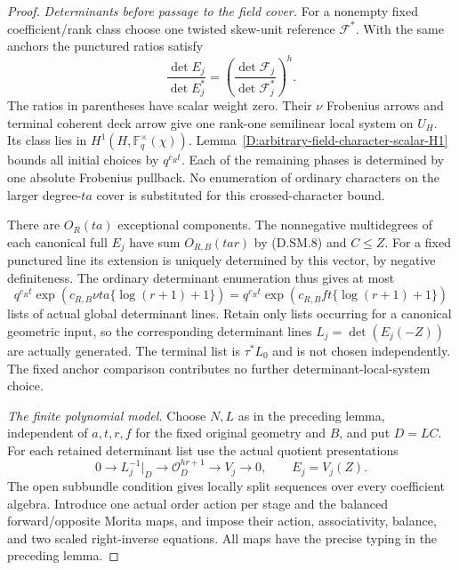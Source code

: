 \begin{proof}
\emph{Determinants before passage to the field cover.}
For a nonempty fixed coefficient/rank class choose
one twisted skew-unit reference $\mathcal F^*$.
With the same anchors the punctured ratios satisfy
\[
 \frac{\det E_j}{\det E_j^*}
   =\left(\frac{\det\mathcal F_j}
                    {\det\mathcal F_j^*}\right)^h .
                                                        \tag{D.SM.9}
\]
The ratios in parentheses have scalar weight zero.
Their $\nu$ Frobenius arrows and terminal coherent
deck arrow give one rank-one semilinear local system
on $U_H$. Its class lies in
$H^1(H,\mathbb F_q^\times(\chi))$.
Lemma~\ref{D:arbitrary-field-character-scalar-H1}
bounds all initial choices by $q^{c_Rt}$.
Each of the remaining phases is determined by one
absolute Frobenius pullback. No enumeration of
ordinary characters on the larger degree-$ta$ cover
is substituted for this crossed-character bound.

There are $O_R(ta)$ exceptional components. The
nonnegative multidegrees of each canonical full $E_j$
have sum $O_{R,B}(ta r)$ by (D.SM.8) and $C\le Z$.
For a fixed punctured line its extension is uniquely
determined by this vector, by negative definiteness.
The ordinary determinant enumeration thus gives at most
\[
 q^{c_Rt}
    \exp\!\left(c_{R,B}\nu ta\{\log(r+1)+1\}\right)
       =q^{c_Rt}
    \exp\!\left(c_{R,B}ft\{\log(r+1)+1\}\right)          \tag{D.SM.10}
\]
lists of actual global determinant lines.
Retain only lists occurring for a canonical geometric
input, so the corresponding determinant lines
$L_j=\det(E_j(-Z))$ are actually generated.
The terminal list is $\tau^*L_0$ and is not chosen
independently. The fixed anchor comparison contributes
no further determinant-local-system choice.

\emph{The finite polynomial model.}
Choose $N,L$ as in the preceding lemma, independent
of $a,t,r,f$ for the fixed original geometry and $B$,
and put $D=LC$. For each retained determinant list use
the actual quotient presentations
\[
 0\longrightarrow L_j^{-1}|_D\longrightarrow
       \mathcal O_D^{hr+1}\longrightarrow V_j\longrightarrow0,
       \qquad E_j=V_j(Z).
                                                        \tag{D.SM.11}
\]
The open subbundle condition gives locally split
sequences over every coefficient algebra.
Introduce one actual order action per stage and the
balanced forward/opposite Morita maps, and impose
their action, associativity, balance, and two scaled
right-inverse equations. All maps have the precise
typing in the preceding lemma.


\end{proof}
